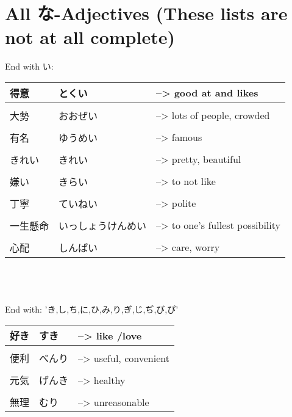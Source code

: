 \documentclass{article}
\begin{document}


\section{All な-Adjectives (These lists are not at all complete)}
End with い: \\
\begin{tabular}{ l | l l }
得意&とくい&--> good at and likes \\ \hline\\[-1em]
大勢 &おおぜい&--> lots of people, crowded\\ \hline\\[-1em]
有名 &ゆうめい&--> famous\\ \hline\\[-1em]
きれい &きれい&--> pretty, beautiful \\ \hline\\[-1em]
嫌い&きらい&--> to not like\\ \hline\\[-1em]
丁寧 &ていねい &--> polite\\ \hline\\[-1em]
一生懸命&いっしょうけんめい&--> to one’s fullest possibility\\ \hline\\[-1em]
心配&しんぱい&--> care, worry %
\end{tabular} \\ \\ \\
End with: 'き,し,ち,に,ひ,み,り,ぎ,じ,ぢ,び,ぴ' \\
\begin{tabular}{ l | l l }
好き&すき&--> like /love\\ \hline\\[-1em]
便利&べんり&--> useful, convenient\\ \hline\\[-1em]
元気&げんき&--> healthy\\ \hline\\[-1em]
無理 	&むり 	&--> unreasonable %
\end{tabular} \\ \\ \\
\end{document}
